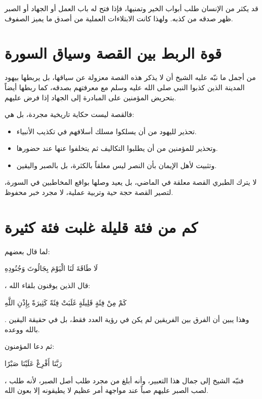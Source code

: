 \begin{fawaid}
قد يكثر من الإنسان طلب أبواب الخير وتمنيها، فإذا فتح له باب العمل أو الجهاد أو الصبر ظهر صدقه من كذبه. ولهذا كانت الابتلاءات العملية من أصدق ما يميز الصفوف.
\end{fawaid}

\section{قوة الربط بين القصة وسياق السورة}
من أجمل ما نبّه عليه الشيخ أن  لا يذكر هذه القصة معزولة عن سياقها، بل يربطها بيهود المدينة الذين كذبوا النبي صلى الله عليه وسلم مع معرفتهم بصدقه، كما ربطها أيضاً بتحريض المؤمنين على المبادرة إلى الجهاد إذا فرض عليهم.

فالقصة ليست حكاية تاريخية مجردة، بل هي:
\begin{itemize}
    \item تحذير لليهود من أن يسلكوا مسلك أسلافهم في تكذيب الأنبياء.
    \item وتحذير للمؤمنين من أن يطلبوا التكاليف ثم يتخلفوا عنها عند حضورها.
    \item وتثبيت لأهل الإيمان بأن النصر ليس معلقاً بالكثرة، بل بالصبر واليقين.
\end{itemize}

\begin{fawaid}
لا يترك الطبري القصة معلقة في الماضي، بل يعيد وصلها بواقع المخاطبين في السورة، لتصير القصة حجة حية وتربية عملية، لا مجرد خبر محفوظ.
\end{fawaid}

\section{كم من فئة قليلة غلبت فئة كثيرة}
لما قال بعضهم: \begin{ayah}لَا طَاقَةَ لَنَا الْيَوْمَ بِجَالُوتَ وَجُنُودِهِ\end{ayah}، قال الذين يوقنون بلقاء الله: \begin{ayah}كَمْ مِنْ فِئَةٍ قَلِيلَةٍ غَلَبَتْ فِئَةً كَثِيرَةً بِإِذْنِ اللَّهِ\end{ayah}. وهذا يبين أن الفرق بين الفريقين لم يكن في رؤية العدد فقط، بل في حقيقة اليقين بالله ووعده.

ثم دعا المؤمنون: \begin{ayah}رَبَّنَا أَفْرِغْ عَلَيْنَا صَبْرًا\end{ayah}، فنبّه الشيخ إلى جمال هذا التعبير، وأنه أبلغ من مجرد طلب أصل الصبر، لأنه طلب لصب الصبر عليهم صباً عند مواجهة أمر عظيم لا يطيقونه إلا بعون الله.

